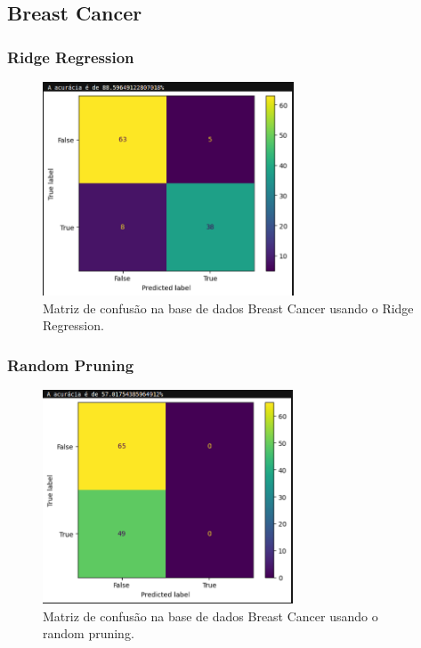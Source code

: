 \documentclass{article}
\begin{document}
\newpage

\subsection*{Breast Cancer}

\vspace{15pt}

\subsubsection*{Ridge Regression}

\begin{figure}[h]

    \centering
    \includegraphics[height=2.5in]{conf_mat_bcancer_l2.png}
    \caption{Matriz de confusão na base de dados Breast Cancer usando o Ridge Regression.}
    \label{fig:example}
    
\end{figure}


\subsubsection*{Random Pruning}

\vspace{25pt}

\begin{figure}[h]

    \centering
    \includegraphics[height=2.5in]{conf_mat_random_pruning_bcancer.png}
    \caption{Matriz de confusão na base de dados Breast Cancer usando o random pruning.}
    \label{fig:example}
    
\end{figure}
\end{document}
